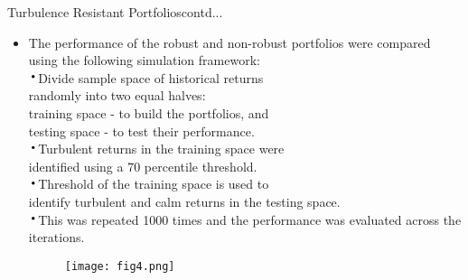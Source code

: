 \documentclass{beamer}
\newcommand*{\LargerCdot}{\raisebox{-0.25ex}{\scalebox{2.3}{$\cdot$}}}
\begin{document}
\begin{frame}{Turbulence Resistant Portfolios}{contd...}
	\vspace*{-0.6in}
	\begin{itemize}
		\item{The performance of the robust and non-robust portfolios were compared using the following simulation framework:}\newline\\
$\LargerCdot$Divide sample space of historical returns \\randomly into two equal halves: \\{\color{blue}training space} - to build the portfolios, and \\{\color{blue}testing space} - to test their performance.\newline\\
		$\LargerCdot$Turbulent returns in the training space were \\ identified using a \alert{70 percentile} threshold.\newline\\
	    $\LargerCdot$Threshold of the training space is used to\\ identify turbulent and calm returns in the testing space.\newline\\
$\LargerCdot$This was repeated 1000 times and the performance was evaluated across the iterations. 
				\begin{figure}{}
			\vspace*{-2.7 in}
			\scalebox{0.5}
			{\hspace*{6.2 in}\texttt{[image: fig4.png]} }
		\end{figure}
	\end{itemize}
\end{frame}
\end{document}
